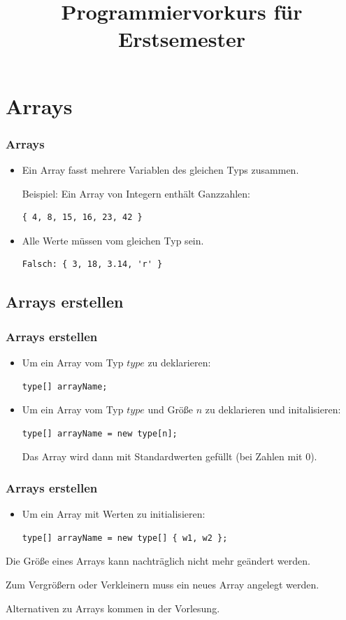 \documentclass[final]{beamer}
\title{Programmiervorkurs für Erstsemester}
\begin{document}
\lstset{tabsize=4}
\lstset{basicstyle=\small}
\lstset{language=java}

\begin{frame}
	\titlepage
\end{frame}

\section{Arrays}
\begin{frame}[containsverbatim]
	\frametitle{Arrays}
	\begin{itemize}
	\item{Ein Array fasst mehrere Variablen des gleichen Typs zusammen.

	Beispiel: Ein Array von Integern enthält Ganzzahlen:}
		\begin{lstlisting}
{ 4, 8, 15, 16, 23, 42 } 
		\end{lstlisting}
	\item{Alle Werte müssen vom gleichen Typ sein.}
		\begin{lstlisting}
Falsch: { 3, 18, 3.14, 'r' }
		\end{lstlisting}
	\end{itemize}
\end{frame}

\subsection{Arrays erstellen}
\begin{frame}[containsverbatim]
	\frametitle{Arrays erstellen}
	\begin{itemize}
	\item{Um ein Array vom Typ $type$ zu deklarieren:
		\begin{lstlisting}
type[] arrayName;
		\end{lstlisting}
		}
	\item{Um ein Array vom Typ $type$ und Größe $n$ zu deklarieren und initalisieren:
		\begin{lstlisting}
type[] arrayName = new type[n];
		\end{lstlisting}
		Das Array wird dann mit Standardwerten gefüllt (bei Zahlen mit $0$).
		}
	\end{itemize}
\end{frame}
\begin{frame}[containsverbatim]
	\frametitle{Arrays erstellen}
	\begin{itemize}
	\item{Um ein Array mit Werten zu initialisieren:
		\begin{lstlisting}
type[] arrayName = new type[] { w1, w2 };
		\end{lstlisting}
		}
	\end{itemize}
	Die Größe eines Arrays kann nachträglich nicht mehr geändert werden.

	Zum Vergrößern oder Verkleinern muss ein neues Array angelegt werden.

	Alternativen zu Arrays kommen in der Vorlesung.
\end{frame}
\end{document}
